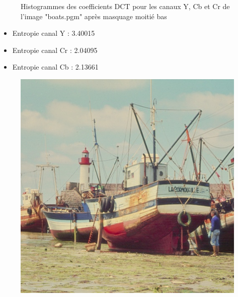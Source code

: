 \documentclass[12pt]{report}
\begin{document}
\begin{figure}[H]
\begin{center}
\caption{Histogrammes des coefficients DCT pour les canaux Y, Cb et Cr de l'image "boats.pgm" après masquage moitié bas}
\end{center}
\end{figure}

\begin{itemize}
\item Entropie canal Y : 3.40015
\item Entropie canal Cr : 2.04095
\item Entropie canal Cb : 2.13661\\
\end{itemize}

\begin{figure}[H]
\begin{center}
\includegraphics[scale=0.4]{../ImageRes/idct_masked2_result.jpg} 

\end{center}
\end{figure}
\end{document}

